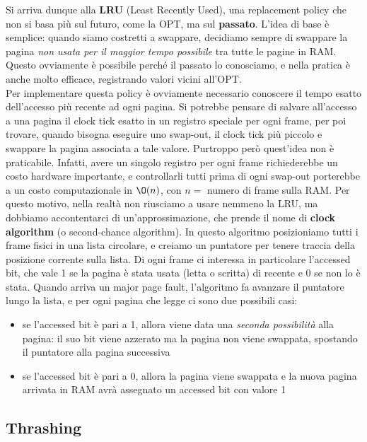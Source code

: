 \documentclass[11pt, a4paper, titlepage, oneside]{scrbook}
\begin{document}
Si arriva dunque alla \textbf{LRU} (Least Recently Used), una replacement policy che non si basa più sul futuro, come la OPT, ma sul \textbf{passato}. L'idea di base è semplice: quando siamo costretti a swappare, decidiamo sempre di swappare la pagina \textit{non usata per il maggior tempo possibile} tra tutte le pagine in RAM. Questo ovviamente è possibile perché il passato lo conosciamo, e nella pratica è anche molto efficace, registrando valori vicini all'OPT. \\
Per implementare questa policy è ovviamente necessario conoscere il tempo esatto dell'accesso più recente ad ogni pagina. Si potrebbe pensare di salvare all'accesso a una pagina il clock tick esatto in un registro speciale per ogni frame, per poi trovare, quando bisogna eseguire uno swap-out, il clock tick più piccolo e swappare la pagina associata a tale valore. Purtroppo però quest'idea non è praticabile. Infatti, avere un singolo registro per ogni frame richiederebbe un costo hardware importante, e controllarli tutti prima di ogni swap-out porterebbe a un costo computazionale in $\O(n)$, con $n = $ numero di frame sulla RAM. Per questo motivo, nella realtà non riusciamo a usare nemmeno la LRU, ma dobbiamo accontentarci di un'approssimazione, che prende il nome di \textbf{clock algorithm} (o second-chance algorithm). In questo algoritmo posizioniamo tutti i frame fisici in una lista circolare, e creiamo un puntatore per tenere traccia della posizione corrente sulla lista. Di ogni frame ci interessa in particolare l'accessed bit, che vale 1 se la pagina è stata usata (letta o scritta) di recente e 0 se non lo è stata. Quando arriva un major page fault, l'algoritmo fa avanzare il puntatore lungo la lista, e per ogni pagina che legge ci sono due possibili casi:
\begin{itemize}
    \item se l'accessed bit è pari a 1, allora viene data una \textit{seconda possibilità} alla pagina: il suo bit viene azzerato ma la pagina non viene swappata, spostando il puntatore alla pagina successiva
    \item se l'accessed bit è pari a 0, allora la pagina viene swappata e la nuova pagina arrivata in RAM avrà assegnato un accessed bit con valore 1 
\end{itemize}

\subsection{Thrashing}
\end{document}
